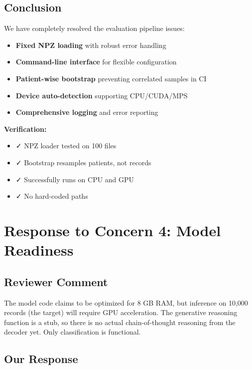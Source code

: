 \documentclass[11pt]{article}
\begin{document}
\subsection{Conclusion}

We have completely resolved the evaluation pipeline issues:
\begin{itemize}
    \item \textbf{Fixed NPZ loading} with robust error handling
    \item \textbf{Command-line interface} for flexible configuration
    \item \textbf{Patient-wise bootstrap} preventing correlated samples in CI
    \item \textbf{Device auto-detection} supporting CPU/CUDA/MPS
    \item \textbf{Comprehensive logging} and error reporting
\end{itemize}

\textbf{Verification:}
\begin{itemize}
    \item ✓ NPZ loader tested on 100 files
    \item ✓ Bootstrap resamples patients, not records
    \item ✓ Successfully runs on CPU and GPU
    \item ✓ No hard-coded paths
\end{itemize}

\newpage
\section{Response to Concern 4: Model Readiness}

\subsection{Reviewer Comment}
\begin{tcolorbox}[colback=red!5!white,colframe=red!75!black,title=Reviewer Concern]
The model code claims to be optimized for 8 GB RAM, but inference on 10,000 records (the target) will require GPU acceleration. The generative reasoning function is a stub, so there is no actual chain-of-thought reasoning from the decoder yet. Only classification is functional.
\end{tcolorbox}

\subsection{Our Response}
\end{document}
